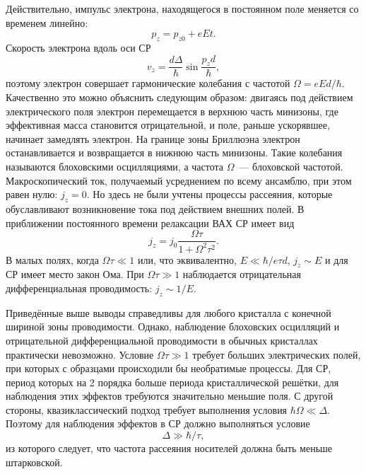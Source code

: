 Действительно, импульс электрона, находящегося в постоянном поле меняется со временем линейно:
\begin{equation*}
  p_z = p_{z0} + eEt.
\end{equation*}
Скорость электрона вдоль оси СР
\begin{equation*}
  v_z = \frac{d\Delta}{\hbar}\sin\frac{p_z d}{\hbar},
\end{equation*}
поэтому электрон совершает гармонические колебания с частотой \( \Omega = eEd/\hbar \). Качественно это можно объяснить следующим образом: двигаясь под действием электрического поля электрон перемещается в верхнюю часть минизоны, где эффективная масса становится отрицательной, и поле, раньше ускорявшее, начинает замедлять электрон. На границе зоны Бриллюэна электрон останавливается и возвращается в нижнюю часть минизоны. Такие колебания называются блоховскими осцилляциями, а частота \( \Omega \)~--- блоховской частотой. Макроскопический ток, получаемый усреднением по всему ансамблю, при этом равен нулю: \( j_z = 0 \). Но здесь не были учтены процессы рассеяния, которые обуславливают возникновение тока под действием внешних полей. В приближении постоянного времени релаксации ВАХ СР имеет вид
\begin{equation*}
  j_z = j_0\frac{\Omega\tau}{1+\Omega^2\tau^2}.
\end{equation*}
В малых полях, когда \( \Omega\tau \ll 1 \) или, что эквивалентно, \( E \ll \hbar / e\tau d \), \( j_z \sim E \) и для СР имеет место закон Ома. При \( \Omega\tau \gg 1 \) наблюдается отрицательная дифференциальная проводимость: \( j_z \sim 1/E \).

Приведённые выше выводы справедливы для любого кристалла с конечной шириной зоны проводимости. Однако, наблюдение блоховских осцилляций и отрицательной дифференциальной проводимости в обычных кристаллах практически невозможно. Условие \( \Omega\tau \gg 1 \) требует больших электрических полей, при которых с образцами происходили бы необратимые процессы. Для СР, период которых на 2 порядка больше периода кристаллической решётки, для наблюдения этих эффектов требуются значительно меньшие поля. С другой стороны, квазиклассический подход требует выполнения условия \( \hbar\Omega \ll \Delta \). Поэтому для наблюдения эффектов в СР должно выполняться условие
\begin{equation*}
  \Delta \gg \hbar / \tau,
\end{equation*}
из которого следует, что частота рассеяния носителей должна быть меньше штарковской.

